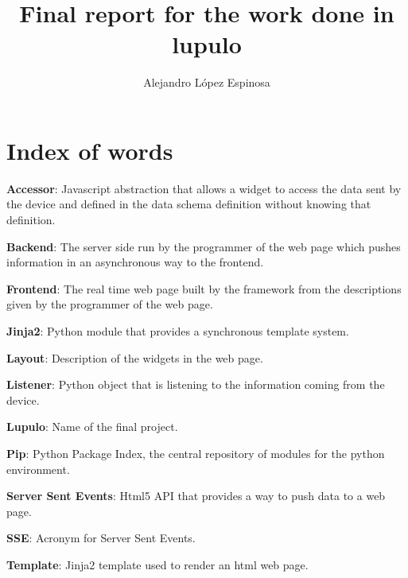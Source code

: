 \documentclass[12pt]{article}
\title{\Huge{\bf Final report for the work done in lupulo}}
\author{\Large{Alejandro López Espinosa}}
\begin{document}
    \maketitle
    \begin{abstract}

    \end{abstract}

    \thispagestyle{empty}

    \newpage
    \tableofcontents
    \thispagestyle{empty}

    \newpage
    \setcounter{page}{1}
    \newpage
        \section{Index of words}
            \setlength{\parindent}{0cm}
            \textbf{Accessor}: Javascript abstraction that allows a
                widget to access the data sent by the device and defined in the
                data schema definition without knowing that definition.

            \textbf{Backend}: The server side run by the programmer of
                the web page which pushes information in an asynchronous way to
                the frontend.

            \textbf{Frontend}: The real time web page built by the
                framework from the descriptions given by the programmer of the
                web page.

            \textbf{Jinja2}: Python module that provides a synchronous
                template system.

            \textbf{Layout}: Description of the widgets in the web
                page.

            \textbf{Listener}: Python object that is listening to the
                information coming from the device.

            \textbf{Lupulo}: Name of the final project.

            \textbf{Pip}: Python Package Index, the central repository
                of modules for the python environment.

            \textbf{Server Sent Events}: Html5 API that provides a way
                to push data to a web page.

            \textbf{SSE}: Acronym for Server Sent Events.

            \textbf{Template}: Jinja2 template used to render an html
                web page.
\end{document}
